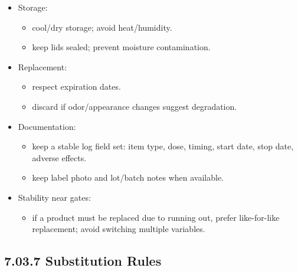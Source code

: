 \documentclass[10pt]{article}
\begin{document}
\begin{itemize}
\item Storage:
  \begin{itemize}
  \item cool/dry storage; avoid heat/humidity.
  \item keep lids sealed; prevent moisture contamination.
  \end{itemize}
\item Replacement:
  \begin{itemize}
  \item respect expiration dates.
  \item discard if odor/appearance changes suggest degradation.
  \end{itemize}
\item Documentation:
  \begin{itemize}
  \item keep a stable log field set: item type, dose, timing, start date, stop date, adverse effects.
  \item keep label photo and lot/batch notes when available.
  \end{itemize}
\item Stability near gates:
  \begin{itemize}
  \item if a product must be replaced due to running out, prefer like-for-like replacement; avoid switching multiple variables.
  \end{itemize}
\end{itemize}

\subsection*{7.03.7 Substitution Rules}
{}
\end{document}
